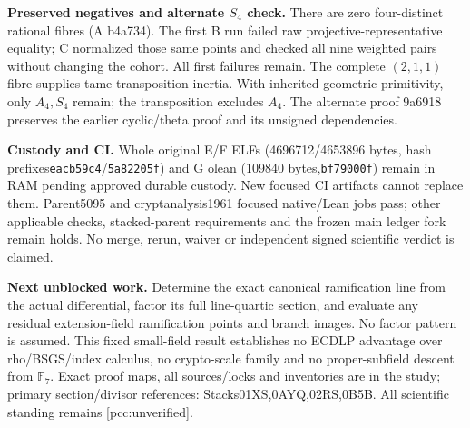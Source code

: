 \documentclass[10pt,a4paper]{article}
\begin{document}
\textbf{Preserved negatives and alternate $S_4$ check.} There are zero
four-distinct rational fibres (A b4a734). The first B run failed raw
projective-representative equality; C normalized those same points and
checked all nine weighted pairs without changing the cohort. All first
failures remain. The complete $(2,1,1)$ fibre supplies tame transposition
inertia. With inherited geometric primitivity, only $A_4,S_4$ remain;
the transposition excludes $A_4$. The alternate proof 9a6918 preserves
the earlier cyclic/theta proof and its unsigned dependencies.

\textbf{Custody and CI.} Whole original E/F ELFs (4696712/4653896 bytes,
hash prefixes\texttt{eacb59c4}/\texttt{5a82205f}) and G olean
(109840 bytes,\texttt{bf79000f}) remain in RAM pending approved durable
custody. New focused CI artifacts cannot replace them. Parent5095 and
cryptanalysis1961 focused native/Lean jobs pass; other applicable checks,
stacked-parent requirements and the frozen main ledger fork remain holds.
No merge, rerun, waiver or independent signed scientific verdict is claimed.

\textbf{Next unblocked work.} Determine the exact canonical ramification
line from the actual differential, factor its full line-quartic section,
and evaluate any residual extension-field ramification points and branch
images. No factor pattern is assumed. This fixed small-field result
establishes no ECDLP advantage over rho/BSGS/index calculus, no
crypto-scale family and no proper-subfield descent from $\mathbb F_7$.
Exact proof maps, all sources/locks and inventories are in the study;
primary section/divisor references: Stacks01XS,0AYQ,02RS,0B5B.
All scientific standing remains [pcc:unverified].
\end{document}
